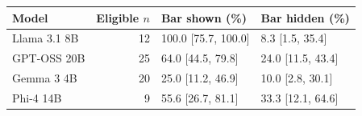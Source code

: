\begin{tabular}{lrll}
\toprule
Model & Eligible $n$ & Bar shown (\%) & Bar hidden (\%) \\
\midrule
Llama 3.1 8B & 12 & 100.0 [75.7, 100.0] & 8.3 [1.5, 35.4] \\
GPT-OSS 20B & 25 & 64.0 [44.5, 79.8] & 24.0 [11.5, 43.4] \\
Gemma 3 4B & 20 & 25.0 [11.2, 46.9] & 10.0 [2.8, 30.1] \\
Phi-4 14B & 9 & 55.6 [26.7, 81.1] & 33.3 [12.1, 64.6] \\
\bottomrule
\end{tabular}
